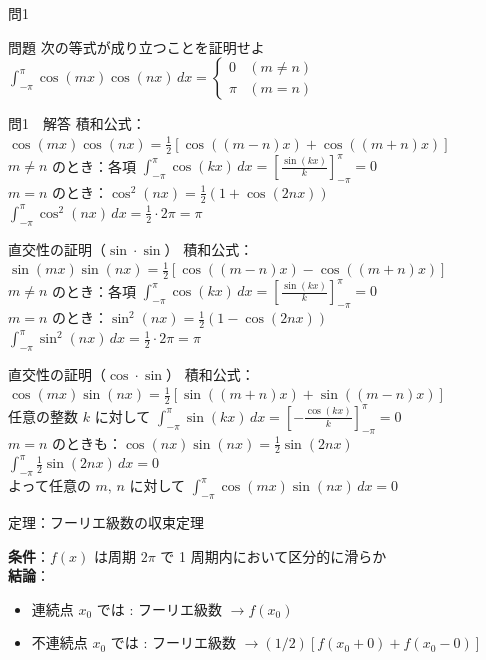 \documentclass[professionalfonts]{beamer}
\begin{document}
\begin{frame}{問1}
  \begin{exampleblock}{問題}
    次の等式が成り立つことを証明せよ\\[2pt]
    $\displaystyle\int_{-\pi}^{\pi} \cos(mx)\cos(nx)\,dx = \begin{cases} 0 & (m \neq n) \\ \pi & (m = n) \end{cases}$
  \end{exampleblock}
\end{frame}

\begin{frame}{問1　解答}
  積和公式：$\cos(mx)\cos(nx) = \frac{1}{2}[\cos((m-n)x) + \cos((m+n)x)]$\\[4pt]
  $m \neq n$ のとき：各項 $\int_{-\pi}^{\pi}\cos(kx)\,dx = \left[\frac{\sin(kx)}{k}\right]_{-\pi}^{\pi} = 0$\\[4pt]
  $m = n$ のとき：$\cos^{2}(nx) = \frac{1}{2}(1+\cos(2nx))$\\[4pt]
  $\int_{-\pi}^{\pi}\cos^{2}(nx)\,dx = \frac{1}{2}\cdot 2\pi = \pi$
\end{frame}

\begin{frame}{直交性の証明（$\sin\cdot\sin$）}
  積和公式：$\sin(mx)\sin(nx) = \frac{1}{2}[\cos((m-n)x) - \cos((m+n)x)]$\\[4pt]
  $m \neq n$ のとき：各項 $\int_{-\pi}^{\pi}\cos(kx)\,dx = \left[\frac{\sin(kx)}{k}\right]_{-\pi}^{\pi} = 0$\\[4pt]
  $m = n$ のとき：$\sin^{2}(nx) = \frac{1}{2}(1-\cos(2nx))$\\[4pt]
  $\int_{-\pi}^{\pi}\sin^{2}(nx)\,dx = \frac{1}{2}\cdot 2\pi = \pi$
\end{frame}

\begin{frame}{直交性の証明（$\cos\cdot\sin$）}
  積和公式：$\cos(mx)\sin(nx) = \frac{1}{2}[\sin((m+n)x) + \sin((m-n)x)]$\\[4pt]
  任意の整数 $k$ に対して $\int_{-\pi}^{\pi}\sin(kx)\,dx = \left[-\frac{\cos(kx)}{k}\right]_{-\pi}^{\pi} = 0$\\[4pt]
  $m = n$ のときも：$\cos(nx)\sin(nx) = \frac{1}{2}\sin(2nx)$\\[4pt]
  $\int_{-\pi}^{\pi}\frac{1}{2}\sin(2nx)\,dx = 0$\\[6pt]
  よって任意の $m,\,n$ に対して $\int_{-\pi}^{\pi}\cos(mx)\sin(nx)\,dx = 0$
\end{frame}

\begin{frame}{定理：フーリエ級数の収束定理}
  \begin{block}{}
  \textbf{条件}：$f(x)$ は周期 $2\pi$ で 1 周期内において区分的に滑らか\\[6pt]
  \textbf{結論}：
  \begin{itemize}
    \item 連続点 $x_{0}$ では : フーリエ級数 $ \to f(x_{0})$
    \item 不連続点 $x_{0}$ では : フーリエ級数 $ \to (1/2)[f(x_{0}+0) + f(x_{0}-0)]$
  \end{itemize}
  \end{block}
\end{frame}
\end{document}

